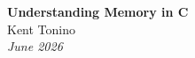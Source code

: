 
    \begin{center}
        {\Huge\textbf{Understanding Memory in C}}\\[1.0em]
        \large{Kent Tonino}\\[0.5em]
        \textit{\large{June 2026}}
    \end{center}
